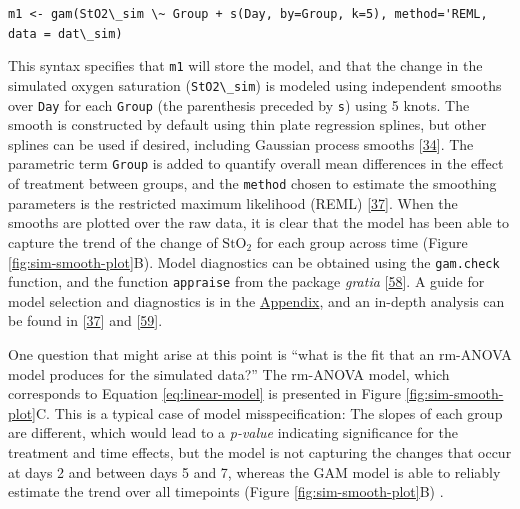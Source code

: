 \documentclass[
]{article}
\newcommand{\passthrough}[1]{#1}
\begin{document}
\passthrough{\lstinline!m1 <- gam(StO2\_sim \~ Group + s(Day, by=Group, k=5), method='REML, data = dat\_sim)!}

This syntax specifies that \passthrough{\lstinline!m1!} will store the model, and that the change in the simulated oxygen saturation (\passthrough{\lstinline!StO2\_sim!}) is modeled using independent smooths over \passthrough{\lstinline!Day!} for each \passthrough{\lstinline!Group!} (the parenthesis preceded by \passthrough{\lstinline!s!}) using 5 knots. The smooth is constructed by default using thin plate regression splines, but other splines can be used if desired, including Gaussian process smooths {[}\protect\hyperlink{ref-simpson2018}{34}{]}. The parametric term \passthrough{\lstinline!Group!} is added to quantify overall mean differences in the effect of treatment between groups, and the \passthrough{\lstinline!method!} chosen to estimate the smoothing parameters is the restricted maximum likelihood (REML) {[}\protect\hyperlink{ref-wood2017}{37}{]}. When the smooths are plotted over the raw data, it is clear that the model has been able to capture the trend of the change of \(\mbox{StO}_2\) for each group across time (Figure \ref{fig:sim-smooth-plot}B). Model diagnostics can be obtained using the \passthrough{\lstinline!gam.check!} function, and the function \passthrough{\lstinline!appraise!} from the package \emph{gratia} {[}\protect\hyperlink{ref-gratia}{58}{]}. A guide for model selection and diagnostics is in the \protect\hyperlink{workflow}{Appendix}, and an in-depth analysis can be found in {[}\protect\hyperlink{ref-wood2017}{37}{]} and {[}\protect\hyperlink{ref-harezlak2018}{59}{]}.

One question that might arise at this point is ``what is the fit that an rm-ANOVA model produces for the simulated data?'' The rm-ANOVA model, which corresponds to Equation \eqref{eq:linear-model} is presented in Figure \ref{fig:sim-smooth-plot}C. This is a typical case of model misspecification: The slopes of each group are different, which would lead to a \emph{p-value} indicating significance for the treatment and time effects, but the model is not capturing the changes that occur at days 2 and between days 5 and 7, whereas the GAM model is able to reliably estimate the trend over all timepoints (Figure \ref{fig:sim-smooth-plot}B) .
\end{document}
